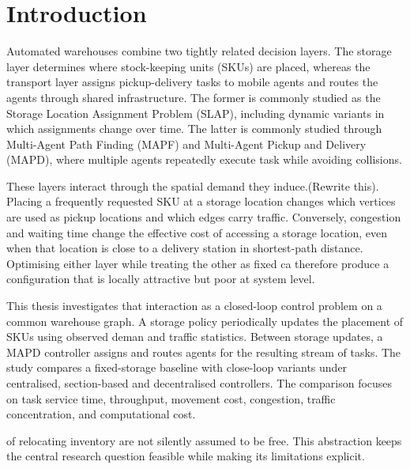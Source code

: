 
\section{Introduction}
\label{sec:introduction}
Automated warehouses combine two tightly related decision layers. The storage layer determines where stock-keeping units (SKUs) are placed, whereas the transport layer assigns pickup-delivery tasks to mobile agents and routes the agents through shared infrastructure. The former is commonly studied as the Storage Location Assignment Problem (SLAP), including dynamic variants in which assignments change over time. The latter is commonly studied through Multi-Agent Path Finding (MAPF) and Multi-Agent Pickup and Delivery (MAPD), where multiple agents repeatedly execute task while avoiding collisions. 

These layers interact through the spatial demand they induce.(Rewrite this). Placing a frequently requested SKU at a storage location changes which vertices are used as pickup locations and which edges carry traffic. Conversely, congestion and waiting time change the effective cost of accessing a storage location, even when that location is close to a delivery station in shortest-path distance. Optimising either layer while treating the other as fixed ca therefore produce a configuration that is locally attractive but poor at system level.

This thesis investigates that interaction as a closed-loop control problem on a common warehouse graph. A storage policy periodically updates the placement of SKUs using observed deman and traffic statistics. Between storage updates, a MAPD controller assigns and routes agents for the resulting stream of tasks. The study compares a fixed-storage baseline with close-loop variants under centralised, section-based and decentralised controllers. The comparison focuses on task service time, throughput, movement cost, congestion, traffic concentration, and computational cost.

of relocating inventory are not silently assumed to be free. This abstraction keeps the central research question feasible while making its limitations explicit.

